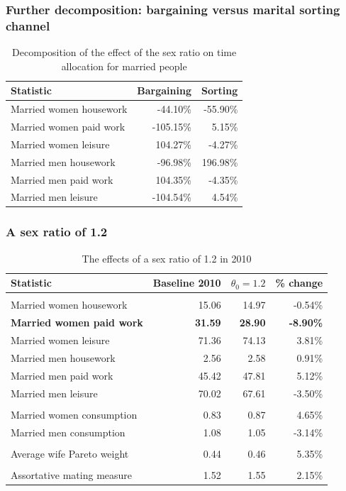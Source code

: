 \documentclass{beamer}
\begin{document}
\begin{frame}
	\frametitle{Further decomposition: bargaining versus marital sorting channel}
	\begin{table}[htbp]
		\centering
		\caption{Decomposition of the effect of the sex ratio on time allocation for married people}
		\begin{tabular}{lrr}
			\toprule
			Statistic & \multicolumn{1}{l}{Bargaining} & \multicolumn{1}{l}{Sorting} \\
			\midrule
			Married women housework & -44.10\% & -55.90\% \\
			Married women paid work & -105.15\% & 5.15\% \\
			Married women leisure & 104.27\% & -4.27\% \\
			Married men housework & -96.98\% & 196.98\% \\
			Married men paid work & 104.35\% & -4.35\% \\
			Married men leisure & -104.54\% & 4.54\% \\
			\bottomrule
			\bottomrule
		\end{tabular}
	\end{table}
\end{frame}

\begin{frame}
	\frametitle{A sex ratio of 1.2}
	\scriptsize
	\begin{table}[htbp]
		\centering
		\caption{The effects of a sex ratio of 1.2 in 2010}
		\begin{tabular}{lrrr}
			\toprule
			Statistic & \multicolumn{1}{l}{Baseline 2010} & \multicolumn{1}{l}{$\theta_0=1.2$} & \multicolumn{1}{l}{\% change} \\
			\midrule
			&       &       &  \\
			Married women housework & 15.06 & 14.97 & -0.54\% \\
			\textcolor[rgb]{ 1,  0,  0}{\textbf{Married women paid work}} & \textcolor[rgb]{ 1,  0,  0}{\textbf{31.59}} & \textcolor[rgb]{ 1,  0,  0}{\textbf{28.90}} & \textcolor[rgb]{ 1,  0,  0}{\textbf{-8.90\%}} \\
			Married women leisure & 71.36 & 74.13 & 3.81\% \\
			Married men housework & 2.56  & 2.58  & 0.91\% \\
			Married men paid work & 45.42 & 47.81 & 5.12\% \\
			Married men leisure & 70.02 & 67.61 & -3.50\% \\
			&       &       &  \\
			Married women consumption & 0.83  & 0.87  & 4.65\% \\
			Married men consumption & 1.08  & 1.05  & -3.14\% \\
			&       &       &  \\
			Average wife Pareto weight & 0.44  & 0.46  & 5.35\% \\
			&       &       &  \\
			Assortative mating measure & 1.52  & 1.55  & 2.15\% \\
			\bottomrule
			\bottomrule
		\end{tabular}
	\end{table}
\end{frame}
\end{document}
